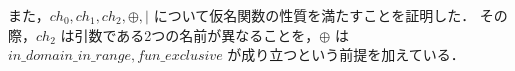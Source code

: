 また，$ch_0, ch_1, ch_2, \oplus, |$ について仮名関数の性質を満たすことを証明した．
その際，$ch_2$ は引数である2つの名前が異なることを，$\oplus$ は $in\_domain\_in\_range, fun\_exclusive$ が成り立つという前提を加えている．













